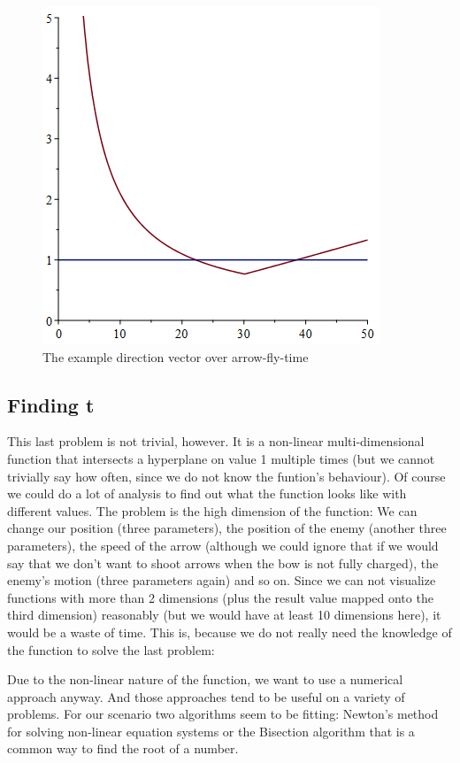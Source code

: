 \begin{figure}
    \centering
    \includegraphics{dirfunc.png}
    \caption{The example direction vector over arrow-fly-time}
    \label{fig:plot_dir}
\end{figure}

\subsection{Finding t}

This last problem is not trivial, however. It is a non-linear multi-dimensional function that intersects a hyperplane on value 1 multiple times (but we cannot trivially say how often, since we do not know the funtion's behaviour). Of course we could do a lot of analysis to find out what the function looks like with different values. The problem is the high dimension of the function: We can change our position (three parameters), the position of the enemy (another three parameters), the speed of the arrow (although we could ignore that if we would say that we don't want to shoot arrows when the bow is not fully charged), the enemy's motion (three parameters again) and so on. Since we can not visualize functions with more than 2 dimensions (plus the result value mapped onto the third dimension) reasonably (but we would have at least 10 dimensions here), it would be a waste of time. This is, because we do not really need the knowledge of the function to solve the last problem:

Due to the non-linear nature of the function, we want to use a numerical approach anyway. And those approaches tend to be useful on a variety of problems. For our scenario two algorithms seem to be fitting: Newton's method for solving non-linear equation systems or the Bisection algorithm that is a common way to find the root of a number.


